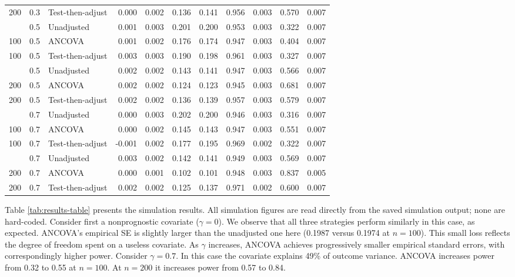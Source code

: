 \documentclass[
  11pt,
]{article}
\newcounter{none} %
\begin{document}
\begin{table}[!h]
{\begin{tabular}[t]{rrlrrrrrrrr}
200 & 0.3 & Test-then-adjust & 0.000 & 0.002 & 0.136 & 0.141 & 0.956 & 0.003 & 0.570 & 0.007\\
\addlinespace
100 & 0.5 & Unadjusted & 0.001 & 0.003 & 0.201 & 0.200 & 0.953 & 0.003 & 0.322 & 0.007\\
100 & 0.5 & ANCOVA & 0.001 & 0.002 & 0.176 & 0.174 & 0.947 & 0.003 & 0.404 & 0.007\\
100 & 0.5 & Test-then-adjust & 0.003 & 0.003 & 0.190 & 0.198 & 0.961 & 0.003 & 0.327 & 0.007\\
\addlinespace
200 & 0.5 & Unadjusted & 0.002 & 0.002 & 0.143 & 0.141 & 0.947 & 0.003 & 0.566 & 0.007\\
200 & 0.5 & ANCOVA & 0.002 & 0.002 & 0.124 & 0.123 & 0.945 & 0.003 & 0.681 & 0.007\\
200 & 0.5 & Test-then-adjust & 0.002 & 0.002 & 0.136 & 0.139 & 0.957 & 0.003 & 0.579 & 0.007\\
\addlinespace
100 & 0.7 & Unadjusted & 0.000 & 0.003 & 0.202 & 0.200 & 0.946 & 0.003 & 0.316 & 0.007\\
100 & 0.7 & ANCOVA & 0.000 & 0.002 & 0.145 & 0.143 & 0.947 & 0.003 & 0.551 & 0.007\\
100 & 0.7 & Test-then-adjust & -0.001 & 0.002 & 0.177 & 0.195 & 0.969 & 0.002 & 0.322 & 0.007\\
\addlinespace
200 & 0.7 & Unadjusted & 0.003 & 0.002 & 0.142 & 0.141 & 0.949 & 0.003 & 0.569 & 0.007\\
200 & 0.7 & ANCOVA & 0.000 & 0.001 & 0.102 & 0.101 & 0.948 & 0.003 & 0.837 & 0.005\\
200 & 0.7 & Test-then-adjust & 0.002 & 0.002 & 0.125 & 0.137 & 0.971 & 0.002 & 0.600 & 0.007\\
\bottomrule
\end{tabular}}
\end{table}

Table \ref{tab:results-table} presents the simulation
results. All simulation figures are read directly from
the saved simulation output; none are hard-coded. Consider
first a nonprognostic covariate (\(\gamma = 0\)). We
observe that all three strategies perform similarly in
this case, as expected. ANCOVA's empirical SE is
slightly larger than the unadjusted one here
(0.1987 versus
0.1974 at \(n = 100\)).
This small loss reflects the degree of freedom spent on
a useless covariate. As
\(\gamma\) increases, ANCOVA achieves progressively
smaller empirical standard errors, with correspondingly
higher power. Consider \(\gamma = 0.7\). In this case the
covariate explains 49\% of outcome variance. ANCOVA
increases power from 0.32
to 0.55 at \(n = 100\).
At \(n = 200\) it increases power from
0.57 to
0.84.
\end{document}
